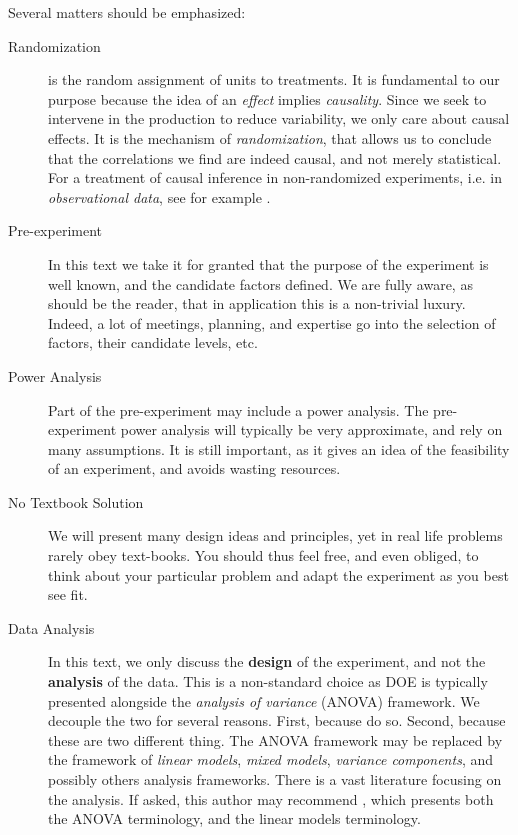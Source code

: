 Several matters should be emphasized:
\begin{description}

\item [Randomization] is the random assignment of units to treatments. 
It is fundamental to our purpose because the idea of an \emph{effect} implies \emph{causality}. 
Since we seek to intervene in the production to reduce variability, we only care about causal effects. 
It is the mechanism of \emph{randomization}, that allows us to conclude that the correlations we find are indeed causal, and not merely statistical.
For a treatment of causal inference in non-randomized experiments, i.e. in \emph{observational data}, see for example \cite{rosenbaum_observational_2002}.

\item [Pre-experiment] In this text we take it for granted that the purpose of the experiment is well known, and the candidate factors defined. 
We are fully aware, as should be the reader, that in application this is a non-trivial luxury. 
Indeed, a lot of meetings, planning, and expertise go into the selection of factors, their candidate levels, etc.

\item [Power Analysis] Part of the pre-experiment may include a power analysis. 
The pre-experiment power analysis will typically be very approximate, and rely on many assumptions. 
It is still important, as it gives an idea of the feasibility of an experiment, and avoids wasting resources.

\item [No Textbook Solution] We will present many design ideas and principles, yet in real life problems rarely obey text-books.
You should thus feel free, and even obliged, to think about your particular problem and adapt the experiment as you best see fit. 

\item[Data Analysis]
In this text, we only discuss the \textbf{design} of the experiment, and not the \textbf{analysis} of the data.
This is a non-standard choice as DOE is typically presented alongside the \emph{analysis of variance} (ANOVA) framework. 
We decouple the two for several reasons. 
First, because \cite{cox_theory_2000} do so. 
Second, because these are two different thing.
The ANOVA framework may be replaced by the framework of \emph{linear models}, \emph{mixed models}, \emph{variance components}, and possibly others analysis frameworks. 
There is a vast literature focusing on the analysis.
If asked, this author may recommend \cite{hocking_analysis_1985}, which presents both the ANOVA terminology, and the linear models terminology.

\end{description}


